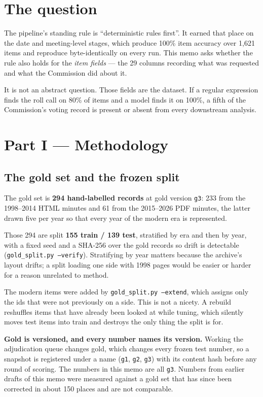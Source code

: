 \documentclass[11pt]{article}
\begin{document}
\tableofcontents
\newpage

\section{The question}

The pipeline's standing rule is ``deterministic rules first''. It earned that place on the
date and meeting-level stages, which produce 100\% item accuracy over 1{,}621 items and
reproduce byte-identically on every run. This memo asks whether the rule also holds for the
\emph{item fields} --- the 29 columns recording what was requested and what the Commission
did about it.

It is not an abstract question. Those fields are the dataset. If a regular expression finds
the roll call on 80\% of items and a model finds it on 100\%, a fifth of the Commission's
voting record is present or absent from every downstream analysis.

\section{Part I --- Methodology}

\subsection{The gold set and the frozen split}
\label{sec:gold}

The gold set is \textbf{294 hand-labelled records} at gold version \texttt{g3}: 233 from the
1998--2014 HTML minutes and 61 from the 2015--2026 PDF minutes, the latter drawn five per
year so that every year of the modern era is represented.

Those 294 are split \textbf{155 train / 139 test}, stratified by era and then by year, with a
fixed seed and a SHA-256 over the gold records so drift is detectable
(\texttt{gold\_split.py --verify}). Stratifying by year matters because the archive's layout
drifts; a split loading one side with 1998 pages would be easier or harder for a reason
unrelated to method.

The modern items were added by \texttt{gold\_split.py --extend}, which assigns only the ids
that were not previously on a side. This is not a nicety. A rebuild reshuffles items that
have already been looked at while tuning, which silently moves test items into train and
destroys the only thing the split is for.

\textbf{Gold is versioned, and every number names its version.} Working the adjudication
queue changes gold, which changes every frozen test number, so a snapshot is registered under
a name (\texttt{g1}, \texttt{g2}, \texttt{g3}) with its content hash before any round of
scoring. The numbers in this memo are all \texttt{g3}. Numbers from earlier drafts of this
memo were measured against a gold set that has since been corrected in about 150 places and
are not comparable.
\end{document}
